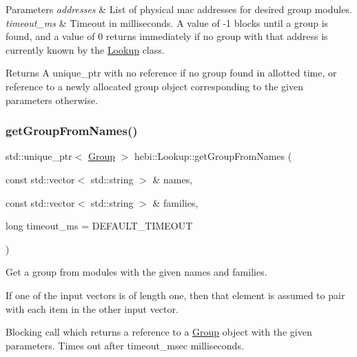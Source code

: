 \begin{DoxyParams}{Parameters}
{\em addresses} & List of physical mac addresses for desired group modules. \\
\hline
{\em timeout\+\_\+ms} & Timeout in milliseconds. A value of -\/1 blocks until a group is found, and a value of 0 returns immediately if no group with that address is currently known by the \hyperlink{classhebi_1_1Lookup}{Lookup} class. \\
\hline
\end{DoxyParams}
\begin{DoxyReturn}{Returns}
A unique\+\_\+ptr with no reference if no group found in allotted time, or reference to a newly allocated group object corresponding to the given parameters otherwise. 
\end{DoxyReturn}
\mbox{\label{classhebi_1_1Lookup_adae9314e23d17ad53e26f146f4c256bf}} 
\subsubsection{\texorpdfstring{get\+Group\+From\+Names()}{getGroupFromNames()}}
{\footnotesize\ttfamily std\+::unique\+\_\+ptr$<$ \hyperlink{classhebi_1_1Group}{Group} $>$ hebi\+::\+Lookup\+::get\+Group\+From\+Names (\begin{DoxyParamCaption}\item[{const std\+::vector$<$ std\+::string $>$ \&}]{names,  }\item[{const std\+::vector$<$ std\+::string $>$ \&}]{families,  }\item[{long}]{timeout\+\_\+ms = {\ttfamily DEFAULT\+\_\+TIMEOUT} }\end{DoxyParamCaption})}



Get a group from modules with the given names and families. 

If one of the input vectors is of length one, then that element is assumed to pair with each item in the other input vector.

Blocking call which returns a reference to a \hyperlink{classhebi_1_1Group}{Group} object with the given parameters. Times out after timeout\+\_\+msec milliseconds.


